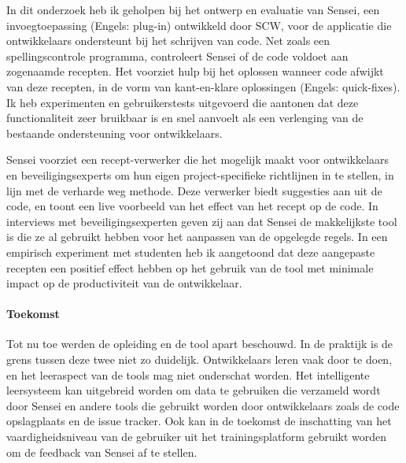 In dit onderzoek heb ik geholpen bij het ontwerp en evaluatie van Sensei, een invoegtoepassing (Engels: plug-in) ontwikkeld door SCW, voor de applicatie die ontwikkelaars ondersteunt bij het schrijven van code.
Net zoals een spellingscontrole programma, controleert Sensei of de code voldoet aan zogenaamde recepten.
Het voorziet hulp bij het oplossen wanneer code afwijkt van deze recepten, in de vorm van kant-en-klare oplossingen (Engels: quick-fixes).
Ik heb experimenten en gebruikerstests uitgevoerd die aantonen dat deze functionaliteit zeer bruikbaar is en snel aanvoelt als een verlenging van de bestaande ondersteuning voor ontwikkelaars.

Sensei voorziet een recept-verwerker die het mogelijk maakt voor ontwikkelaars en beveiligingsexperts om hun eigen project-specifieke richtlijnen in te stellen, in lijn met de verharde weg methode.
Deze verwerker biedt suggesties aan uit de code, en toont een live voorbeeld van het effect van het recept op de code.
In interviews met beveiligingsexperten geven zij aan dat Sensei de makkelijkste tool is die ze al gebruikt hebben voor het aanpassen van de opgelegde regels.
In een empirisch experiment met studenten heb ik aangetoond dat deze aangepaste recepten een positief effect hebben op het gebruik van de tool met minimale impact op de productiviteit van de ontwikkelaar.

\paragraph{Toekomst}
Tot nu toe werden de opleiding en de tool apart beschouwd.
In de praktijk is de grens tussen deze twee niet zo duidelijk.
Ontwikkelaars leren vaak door te doen, en het leeraspect van de tools mag niet onderschat worden.
Het intelligente leersysteem kan uitgebreid worden om data te gebruiken die verzameld wordt door Sensei en andere tools die gebruikt worden door ontwikkelaars zoals de code opslagplaats en de issue tracker.
Ook kan in de toekomst de inschatting van het vaardigheidsniveau van de gebruiker uit het trainingsplatform gebruikt worden om de feedback van Sensei af te stellen.
